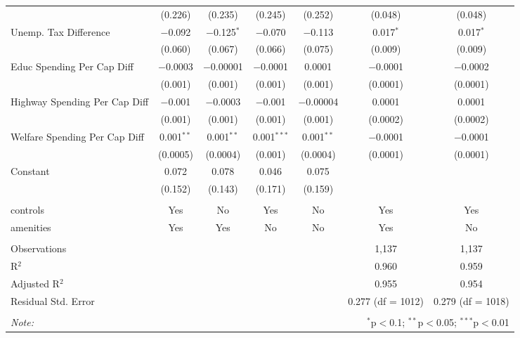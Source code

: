 \begin{table}[!htbp]
\begin{tabular}{@{\extracolsep{5pt}}lcccccc}
  & (0.226) & (0.235) & (0.245) & (0.252) & (0.048) & (0.048) \\ 
  Unemp. Tax Difference & $-$0.092 & $-$0.125$^{*}$ & $-$0.070 & $-$0.113 & 0.017$^{*}$ & 0.017$^{*}$ \\ 
  & (0.060) & (0.067) & (0.066) & (0.075) & (0.009) & (0.009) \\ 
  Educ Spending Per Cap Diff & $-$0.0003 & $-$0.00001 & $-$0.0001 & 0.0001 & $-$0.0001 & $-$0.0002 \\ 
  & (0.001) & (0.001) & (0.001) & (0.001) & (0.0001) & (0.0001) \\ 
  Highway Spending Per Cap Diff & $-$0.001 & $-$0.0003 & $-$0.001 & $-$0.00004 & 0.0001 & 0.0001 \\ 
  & (0.001) & (0.001) & (0.001) & (0.001) & (0.0002) & (0.0002) \\ 
  Welfare Spending Per Cap Diff & 0.001$^{**}$ & 0.001$^{**}$ & 0.001$^{***}$ & 0.001$^{**}$ & $-$0.0001 & $-$0.0001 \\ 
  & (0.0005) & (0.0004) & (0.001) & (0.0004) & (0.0001) & (0.0001) \\ 
  Constant & 0.072 & 0.078 & 0.046 & 0.075 &  &  \\ 
  & (0.152) & (0.143) & (0.171) & (0.159) &  &  \\ 
 \hline \\[-1.8ex] 
controls & Yes & No & Yes & No & Yes & Yes \\ 
amenities & Yes & Yes & No & No & Yes & No \\ 
\hline \\[-1.8ex] 
Observations &  &  &  &  & 1,137 & 1,137 \\ 
R$^{2}$ &  &  &  &  & 0.960 & 0.959 \\ 
Adjusted R$^{2}$ &  &  &  &  & 0.955 & 0.954 \\ 
Residual Std. Error &  &  &  &  & 0.277 (df = 1012) & 0.279 (df = 1018) \\ 
\hline 
\hline \\[-1.8ex] 
\textit{Note:}  & \multicolumn{6}{r}{$^{*}$p$<$0.1; $^{**}$p$<$0.05; $^{***}$p$<$0.01} \\ 
\end{tabular} 
\end{table} 
